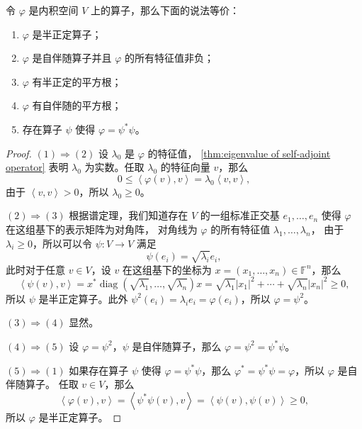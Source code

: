 \documentclass[fontset=none,zihao=-4]{Notes}
\DeclareMathOperator\diag{diag}
\newcommand{\inn}[1]{\left\langle#1\right\rangle}
\begin{document}
\begin{theorem}[半正定算子的刻画]\label{thm:property of semipositive}
  令 $\varphi$ 是内积空间 $V$ 上的算子，那么下面的说法等价：
  \begin{enumerate}
    \item $\varphi$ 是半正定算子；
    \item $\varphi$ 是自伴随算子并且 $\varphi$ 的所有特征值非负；
    \item $\varphi$ 有半正定的平方根；
    \item $\varphi$ 有自伴随的平方根；
    \item 存在算子 $\psi$ 使得 $\varphi=\psi^*\psi$。
  \end{enumerate}
\end{theorem}
\begin{proof}
  $(1)\Rightarrow (2)$ 设 $\lambda_0$ 是 $\varphi$ 的特征值，
  \autoref{thm:eigenvalue of self-adjoint operator} 表明 $\lambda_0$
  为实数。任取 $\lambda_0$ 的特征向量 $v$，那么
  \[
    0\leq\inn{\varphi(v),v}=\lambda_0\inn{v,v} , 
  \]
  由于 $\inn{v,v}>0$，所以 $\lambda_0\geq 0$。

  $(2)\Rightarrow(3)$ 根据谱定理，我们知道存在 $V$ 的一组标准正交基
  $e_1,\dots,e_n$ 使得 $\varphi$ 在这组基下的表示矩阵为对角阵，
  对角线为 $\varphi$ 的所有特征值 $\lambda_1,\dots,\lambda_n$，
  由于 $\lambda_i\geq 0$，所以可以令 $\psi:V\to V$ 满足
  \[
    \psi(e_i)=\sqrt{\lambda_i} e_i, 
  \]
  此时对于任意 $v\in V$，设 $v$ 在这组基下的坐标为 $x=(x_1,\dots,x_n)\in\mathbb{F}^n$，那么
  \[
    \inn{\psi(v),v}=x^*\diag\left(\sqrt{\lambda_1},\dots,\sqrt{\lambda_n}\right)  
    x=\sqrt{\lambda_1}|x_1|^2+\cdots+\sqrt{\lambda_n}
    |x_n|^2\geq 0,
  \]
  所以 $\psi$ 是半正定算子。此外 $\psi^2(e_i)=\lambda_ie_i=\varphi(e_i)$，所以
  $\varphi=\psi^2$。

  $(3)\Rightarrow (4)$ 显然。

  $(4)\Rightarrow (5)$ 设 $\varphi=\psi^2$，$\psi$ 是自伴随算子，那么
  $\varphi=\psi^2=\psi^*\psi$。

  $(5)\Rightarrow (1)$ 如果存在算子 $\psi$ 使得 $\varphi=\psi^*\psi$，那么
  $\varphi^*=\psi^*\psi=\varphi$，所以 $\varphi$ 是自伴随算子。
  任取 $v\in V$，那么
  \[
    \inn{\varphi(v),v}=\inn{\psi^*\psi(v),v}=\inn{\psi(v),\psi(v)}\geq 0,  
  \]
  所以 $\varphi$ 是半正定算子。
\end{proof}
\end{document}
